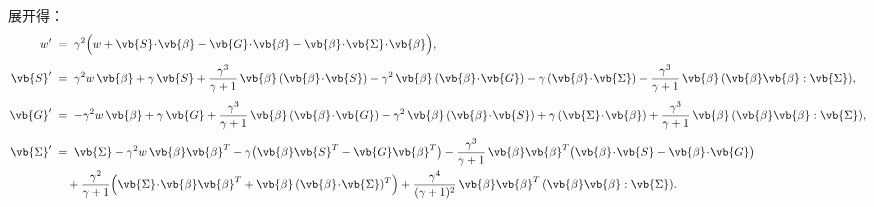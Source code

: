 展开得：
\begin{align*}
	w' \;           & =\; \gamma^{2}\Big( w + \vb{S}\!\cdot\!\vb{\beta}
	-\vb{G}\!\cdot\!\vb{\beta}
	-\vb{\beta}\!\cdot\!\vb{\Sigma}\!\cdot\!\vb{\beta} \Big),                     \\[4pt]
	\vb{S}' \;      & =\; \gamma^{2} w\,\vb{\beta}
	+\gamma\,\vb{S}
	+\frac{\gamma^{3}}{\gamma+1}\,\vb{\beta}\,(\vb{\beta}\!\cdot\!\vb{S})
	-\gamma^{2}\,\vb{\beta}\,(\vb{\beta}\!\cdot\!\vb{G})
	-\gamma\,(\vb{\beta}\!\cdot\!\vb{\Sigma})
	-\frac{\gamma^{3}}{\gamma+1}\,\vb{\beta}\,(\vb{\beta}\vb{\beta}:\vb{\Sigma}), \\[4pt]
	\vb{G}' \;      & =\; -\gamma^{2} w\,\vb{\beta}
	+\gamma\,\vb{G}
	+\frac{\gamma^{3}}{\gamma+1}\,\vb{\beta}\,(\vb{\beta}\!\cdot\!\vb{G})
	-\gamma^{2}\,\vb{\beta}\,(\vb{\beta}\!\cdot\!\vb{S})
	+\gamma\,(\vb{\Sigma}\!\cdot\!\vb{\beta})
	+\frac{\gamma^{3}}{\gamma+1}\,\vb{\beta}\,(\vb{\beta}\vb{\beta}:\vb{\Sigma}), \\[4pt]
	\vb{\Sigma}' \; & =\; \vb{\Sigma}
	-\gamma^{2} w\,\vb{\beta}\vb{\beta}^{T}
	-\gamma\big(\vb{\beta}\vb{S}^{T}-\vb{G}\vb{\beta}^{T}\big)
	-\frac{\gamma^{3}}{\gamma+1}\,\vb{\beta}\vb{\beta}^{T}
	\big(\vb{\beta}\!\cdot\!\vb{S}-\vb{\beta}\!\cdot\!\vb{G}\big)                 \\
	                & \quad
	+\frac{\gamma^{2}}{\gamma+1}\Big(\vb{\Sigma}\!\cdot\!\vb{\beta}\vb{\beta}^{T}
	+\vb{\beta}\,(\vb{\beta}\!\cdot\!\vb{\Sigma})^{T}\Big)
	+\frac{\gamma^{4}}{(\gamma+1)^{2}}\,\vb{\beta}\vb{\beta}^{T}\,
	(\vb{\beta}\vb{\beta}:\vb{\Sigma}).
\end{align*}

